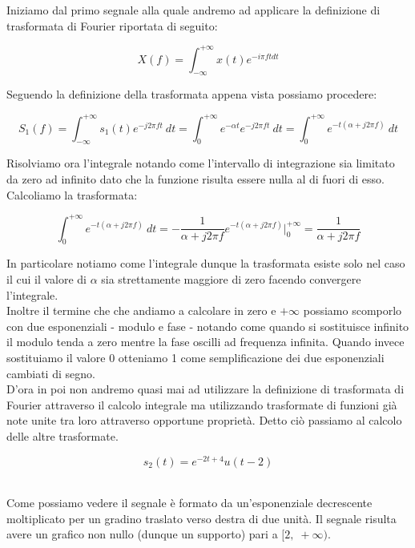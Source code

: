 \documentclass[../main.tex]{subfiles}
\begin{document}
Iniziamo dal primo segnale alla quale andremo ad applicare la definizione di trasformata di Fourier riportata di seguito:

\begin{equation}
	X(f) = \int_{-\infty}^{+\infty} x(t)e^{-i\pi ft  dt}
\end{equation}

Seguendo la definizione della trasformata appena vista possiamo procedere:

\begin{equation}
	S_1(f) = \int_{-\infty}^{+\infty} s_1(t) e^{-j2\pi f t} \:dt = \int_0^{+\infty} e^{-\alpha t} e^{-j2\pi f t} \:dt  = \int_0^{+\infty} e^{-t(\alpha + j2\pi f)} \:dt 
\end{equation}


Risolviamo ora l'integrale notando come l'intervallo di integrazione sia limitato da zero ad infinito dato che la funzione risulta essere nulla al di fuori di esso.\\


Calcoliamo la trasformata:

\begin{equation}
	\int_0^{+\infty} e^{-t(\alpha + j2\pi f)} \:dt  = - \frac{1}{\alpha + j2\pi f} e^{-t(\alpha + j2\pi f)} \bigg|_0^{+\infty} = \frac{1}{\alpha + j2\pi f}
\end{equation}

In particolare notiamo come l'integrale dunque la trasformata esiste solo nel caso il cui il valore di $\alpha$ sia strettamente maggiore di zero facendo convergere l'integrale. \\

Inoltre il termine che che andiamo a calcolare in zero e $+\infty$ possiamo scomporlo con due esponenziali - modulo e fase - notando come quando si sostituisce infinito il modulo tenda a zero mentre la fase oscilli ad frequenza infinita. Quando invece sostituiamo il valore 0 otteniamo 1 come semplificazione dei due esponenziali cambiati di segno.\\

D'ora in poi non andremo quasi mai ad utilizzare la definizione di trasformata di Fourier attraverso il calcolo integrale ma utilizzando trasformate di funzioni già note unite tra loro attraverso opportune proprietà. Detto ciò passiamo al calcolo delle altre trasformate.

\[s_2(t) = e^{-2t +4}u(t-2) \]\

Come possiamo vedere il segnale è formato da un'esponenziale decrescente moltiplicato per un gradino traslato verso destra di due unità.
Il segnale risulta avere un grafico non nullo (dunque un supporto) pari a $[2,\; +\infty)$.\\
\end{document}
